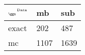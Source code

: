 \begin{tabular}{lll}
    \toprule
    $_{\text{\tiny{\ggn}}}$$^{\text{\tiny{Data}}}$ & mb & sub \\
    \midrule
    exact & 202
              & 487 \\
    mc   & 1107
              & 1639 \\
    \bottomrule
\end{tabular}